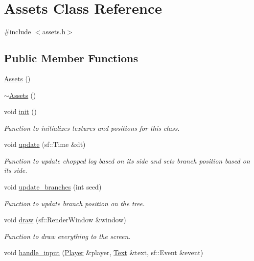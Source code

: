 \hypertarget{class_assets}{}\section{Assets Class Reference}
\label{class_assets}


{\ttfamily \#include $<$assets.\+h$>$}

\subsection*{Public Member Functions}
\begin{DoxyCompactItemize}
\item 
\hyperlink{class_assets_a552bf7f55194d9a4469ccc38c6938142}{Assets} ()
\item 
\hyperlink{class_assets_ae47d41f4f674807c271f64ffc1771b7f}{$\sim$\+Assets} ()
\item 
void \hyperlink{class_assets_a1e07c9e1ddf47daf66001d887df95c7b}{init} ()
\begin{DoxyCompactList}\small\item\em Function to initializes textures and positions for this class. \end{DoxyCompactList}\item 
void \hyperlink{class_assets_a6af3226d6a6960be5260e9edc22cf665}{update} (sf\+::\+Time \&dt)
\begin{DoxyCompactList}\small\item\em Function to update chopped log based on it\textquotesingle{}s side and sets branch position based on it\textquotesingle{}s side. \end{DoxyCompactList}\item 
void \hyperlink{class_assets_a760a66396019d539c1f129134e1eeaa2}{update\+\_\+branches} (int seed)
\begin{DoxyCompactList}\small\item\em Function to update branch position on the tree. \end{DoxyCompactList}\item 
void \hyperlink{class_assets_a22a160044158884eefe4bc93677c0211}{draw} (sf\+::\+Render\+Window \&window)
\begin{DoxyCompactList}\small\item\em Function to draw everything to the screen. \end{DoxyCompactList}\item 
void \hyperlink{class_assets_aab62425b0c76418a434cccac038821c4}{handle\+\_\+input} (\hyperlink{class_player}{Player} \&player, \hyperlink{class_text}{Text} \&text, sf\+::\+Event \&event)

\end{DoxyCompactItemize}
